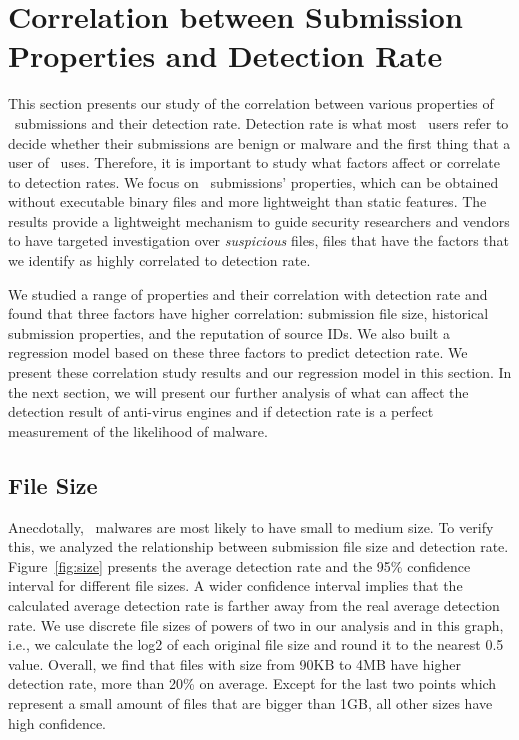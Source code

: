 \section{Correlation between Submission Properties and Detection Rate}
\label{sec:corr}
This section presents our study of the correlation between various properties of
\pe\ submissions and their detection rate. 
Detection rate is what most \vt\ users refer to decide whether their submissions
are benign or malware and the first thing that a user of \vt\ uses. 
Therefore, it is important to study what factors affect or correlate to detection rates. 
We focus on \vt\ submissions' properties, which can be obtained without executable binary files and more lightweight than static features.
The results provide a lightweight mechanism to guide security researchers 
and vendors to have targeted investigation over
{\em suspicious} files, 
files that have the factors that we identify as highly correlated to detection rate.

We studied a range of properties and their correlation with detection rate
and found that three factors have higher correlation:
submission file size,
historical submission properties, and the reputation of source IDs.
We also built a regression model based on these three factors to predict detection rate.
We present these correlation study results and our regression model in this section.
In the next section, we will present our further analysis of what can affect the detection result of anti-virus engines
and if detection rate is a perfect measurement of the likelihood of malware.




\subsection{File Size}
\label{sec:size}
Anecdotally, \pe\ malwares are most likely to have small to medium size. 
To verify this, we analyzed the relationship between submission file size and detection rate. 
Figure~\ref{fig:size} presents the average detection rate and 
the 95\% confidence interval for different file sizes.
A wider confidence interval implies that
the calculated average detection rate is farther away from the real average detection rate.
We use discrete file sizes of powers of two in our analysis and in this graph,
i.e., we calculate the log2 of each original file size and round it to the nearest 0.5 value.
Overall, we find that files with size from 90KB to 4MB have higher detection rate, more than 20\% on average. 
Except for the last two points which represent a small amount of files that are bigger than 1GB, 
all other sizes have high confidence.   

